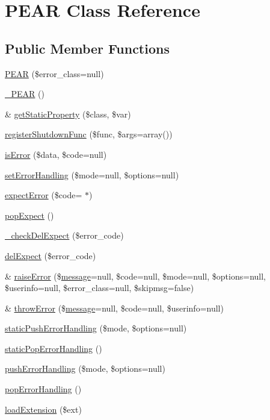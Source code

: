 \hypertarget{classPEAR}{}\section{P\+E\+A\+R Class Reference}
\label{classPEAR}
\subsection*{Public Member Functions}
\begin{DoxyCompactItemize}
\item 
\hyperlink{classPEAR_a1dc6fd8c04eca33173cc78556178b980}{P\+E\+A\+R} (\$error\+\_\+class=null)
\item 
\hyperlink{classPEAR_a282c57b5152ef70d02b3f08ad826af0a}{\+\_\+\+P\+E\+A\+R} ()
\item 
\& \hyperlink{classPEAR_ac189aee05eb30e8926a952cdf8eb9d02}{get\+Static\+Property} (\$class, \$var)
\item 
\hyperlink{classPEAR_aa2575aa1fe7e5b46b99c35aaa367b04c}{register\+Shutdown\+Func} (\$func, \$args=array())
\item 
\hyperlink{classPEAR_aa2608099ea852b3e982928aab10482ba}{is\+Error} (\$data, \$code=null)
\item 
\hyperlink{classPEAR_abb8e73d9d49ad896205667c412332ffb}{set\+Error\+Handling} (\$mode=null, \$options=null)
\item 
\hyperlink{classPEAR_a57f021082c2e63f78a9f7bfd5b10f14b}{expect\+Error} (\$code= \textquotesingle{}$\ast$\textquotesingle{})
\item 
\hyperlink{classPEAR_a3ea2df43e39214a29f77f8773a5afcc4}{pop\+Expect} ()
\item 
\hyperlink{classPEAR_a6350d6f88347be3704dc5967915a7ada}{\+\_\+check\+Del\+Expect} (\$error\+\_\+code)
\item 
\hyperlink{classPEAR_a8aa91fd0c4d61435587519c0417848c5}{del\+Expect} (\$error\+\_\+code)
\item 
\& \hyperlink{classPEAR_add7f8b82b573935527decd2e1af6065d}{raise\+Error} (\$\hyperlink{classmessage}{message}=null, \$code=null, \$mode=null, \$options=null, \$userinfo=null, \$error\+\_\+class=null, \$skipmsg=false)
\item 
\& \hyperlink{classPEAR_a146f08ee812450913835040d43b2c832}{throw\+Error} (\$\hyperlink{classmessage}{message}=null, \$code=null, \$userinfo=null)
\item 
\hyperlink{classPEAR_a5bfc268ba255bb88c2f98bb5f9f0a124}{static\+Push\+Error\+Handling} (\$mode, \$options=null)
\item 
\hyperlink{classPEAR_ad558eaf2cadc1eb2afa180f7a75bcab3}{static\+Pop\+Error\+Handling} ()
\item 
\hyperlink{classPEAR_a44c791bbf9e490da1b053dcd075fd285}{push\+Error\+Handling} (\$mode, \$options=null)
\item 
\hyperlink{classPEAR_adc1bc0e4afb5652ad5c42bbd82b7a353}{pop\+Error\+Handling} ()
\item 
\hyperlink{classPEAR_a0c1ee79fa15f1d8ac1b24686a3d3fe44}{load\+Extension} (\$ext)
\end{DoxyCompactItemize}
